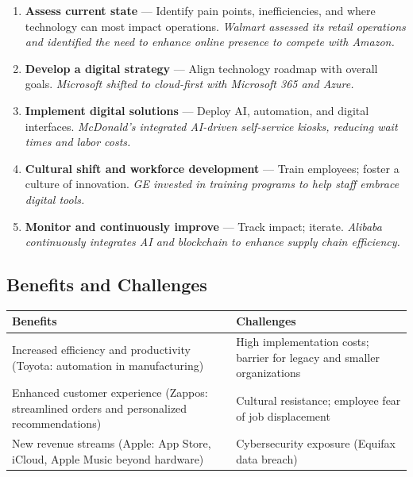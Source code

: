 \documentclass[11pt, letterpaper]{article}
\begin{document}
\begin{enumerate}[leftmargin=*, label=\textbf{Step \arabic*.}]
  \item \textbf{Assess current state} --- Identify pain points, inefficiencies, and where technology can most impact operations. \textit{Walmart assessed its retail operations and identified the need to enhance online presence to compete with Amazon.}
  \item \textbf{Develop a digital strategy} --- Align technology roadmap with overall goals. \textit{Microsoft shifted to cloud-first with Microsoft 365 and Azure.}
  \item \textbf{Implement digital solutions} --- Deploy AI, automation, and digital interfaces. \textit{McDonald's integrated AI-driven self-service kiosks, reducing wait times and labor costs.}
  \item \textbf{Cultural shift and workforce development} --- Train employees; foster a culture of innovation. \textit{GE invested in training programs to help staff embrace digital tools.}
  \item \textbf{Monitor and continuously improve} --- Track impact; iterate. \textit{Alibaba continuously integrates AI and blockchain to enhance supply chain efficiency.}
\end{enumerate}

\subsection{Benefits and Challenges}

\begin{center}
\begin{tabular}{p{6.5cm} p{6.5cm}}
\toprule
\textbf{Benefits} & \textbf{Challenges} \\
\midrule
Increased efficiency and productivity (Toyota: automation in manufacturing) & High implementation costs; barrier for legacy and smaller organizations \\
Enhanced customer experience (Zappos: streamlined orders and personalized recommendations) & Cultural resistance; employee fear of job displacement \\
New revenue streams (Apple: App Store, iCloud, Apple Music beyond hardware) & Cybersecurity exposure (Equifax data breach) \\
\bottomrule
\end{tabular}
\end{center}

\newpage
\end{document}
